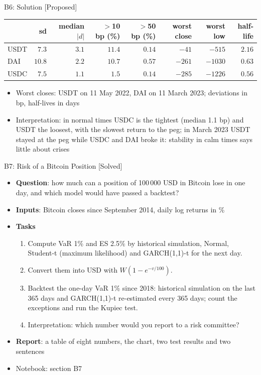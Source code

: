 \ifsolutions
\begin{frame}{B6: Solution [Proposed]}
\itemsize{\footnotesize}
\begin{center}
\scriptsize
\begin{tabular}{lrrrrrrr}
\toprule
& sd & median $|d|$ & $>$10 bp (\%) & $>$50 bp (\%) & worst close & worst low & half-life \\
\midrule
USDT & $7.3$ & $3.1$ & $11.4$ & $0.14$ & $-41$ & $-515$ & $2.16$ \\
DAI & $10.8$ & $2.2$ & $10.7$ & $0.57$ & $-261$ & $-1030$ & $0.63$ \\
USDC & $7.5$ & $1.1$ & $1.5$ & $0.14$ & $-285$ & $-1226$ & $0.56$ \\
\bottomrule
\end{tabular}
\end{center}
\begin{itemize}
    \item Worst closes: USDT on 11 May 2022, DAI on 11 March 2023; deviations in bp, half-lives in days
    \item Interpretation: in normal times USDC is the tightest (median 1.1 bp) and USDT the loosest, with the slowest return to the peg; in March 2023 USDT stayed at the peg while USDC and DAI broke it: stability in calm times says little about crises
\end{itemize}
\end{frame}
\fi

\begin{frame}{B7: Risk of a Bitcoin Position [Solved]}
\itemsize{\footnotesize}
\begin{itemize}
\item \textbf{Question}: how much can a position of 100\,000 USD in Bitcoin lose in one day, and which model would have passed a backtest?
\item \textbf{Inputs}: Bitcoin closes since September 2014, daily log returns in \%
\item \textbf{Tasks}
\begin{enumerate}
    \item Compute VaR 1\% and ES 2.5\% by historical simulation, Normal, Student-t (maximum likelihood) and GARCH(1,1)-t for the next day.
    \item Convert them into USD with $W(1 - e^{-v/100})$.
    \item Backtest the one-day VaR 1\% since 2018: historical simulation on the last 365 days and GARCH(1,1)-t re-estimated every 365 days; count the exceptions and run the Kupiec test.
    \item Interpretation: which number would you report to a risk committee?
\end{enumerate}
\item \textbf{Report}: a table of eight numbers, the chart, two test results and two sentences
\item Notebook: section B7
\end{itemize}
\end{frame}

